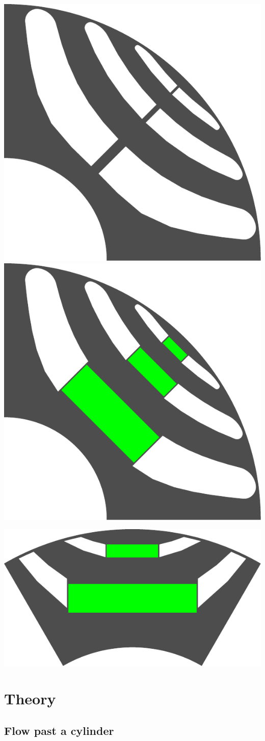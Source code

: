 \documentclass[b5paper,11pt,oneside,fleqn]{article}
\begin{document}
\vspace{\baselineskip}

\includegraphics[width=0.5\linewidth]{ex1}
\includegraphics[width=0.5\linewidth]{ex2}
\vspace{\baselineskip}

\includegraphics[width=0.75\linewidth]{ex3}


\clearpage
\section{Theory}

\subsection{Flow past a cylinder}
\end{document}
